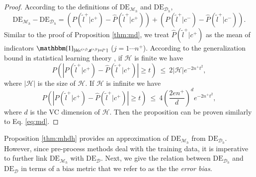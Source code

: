 \documentclass{article}
\begin{document}
\begin{proof}
According to the definitions of $\mathrm{DE}_{\mathcal{M}_{h}}$ and $\mathrm{DE}_{\mathcal{D}_{h}}$,
\begin{equation*}
\mathrm{DE}_{\mathcal{M}_{h}} - \mathrm{DE}_{\mathcal{D}_{h}} = \left( P(\tilde{l}^{+}|c^{+})-\hat{P}(\tilde{l}^{+}|c^{+}) \right) + \left( P(\tilde{l}^{+}|c^{-})-\hat{P}(\tilde{l}^{+}|c^{-}) \right).
\end{equation*}
Similar to the proof of Proposition \ref{thm:md}, we treat $\hat{P}(\tilde{l}^{+}|c^{+})$ as the mean of indicators $\mathbbm{1}_{[h(c^{(+j)},\mathbf{z}^{(+j)})=l^{+}]}$ ($j=1\cdots n^{+}$). According to the generalization bound in statistical learning theory \cite{vapnik1998statistical}, if $\mathcal{H}$ is finite we have
\begin{equation*}
P\left( \left| P(\tilde{l}^{+}|c^{+})-\hat{P}(\tilde{l}^{+}|c^{+}) \right| \geq t \right) ~\leq~ 2|\mathcal{H}| e^{-2n^{+}t^{2}},
\end{equation*}
where $|\mathcal{H}|$ is the size of $\mathcal{H}$. If $\mathcal{H}$ is infinite we have
\begin{equation*}
P\left( \left| P(\tilde{l}^{+}|c^{+})-\hat{P}(\tilde{l}^{+}|c^{+}) \right| \geq t \right) ~\leq~ 4\left( \frac{2en^{+}}{d} \right)^{d} e^{-2n^{+}t^{2}},
\end{equation*}
where $d$ is the VC dimension of $\mathcal{H}$. Then the proposition can be proven similarly to Eq. \eqref{eq:md}.
\end{proof}

Proposition \ref{thm:mhdh} provides an approximation of $\mathrm{DE}_{\mathcal{M}_{h}}$ from $\mathrm{DE}_{\mathcal{D}_{h}}$. However, since pre-process methods deal with the training data, it is imperative to further link $\mathrm{DE}_{\mathcal{M}_{h}}$ with $\mathrm{DE}_{\mathcal{D}}$. Next, we give the relation between $\mathrm{DE}_{\mathcal{D}_{h}}$ and $\mathrm{DE}_{\mathcal{D}}$ in terms of a bias metric that we refer to as the the \emph{error bias}.

\end{document}
